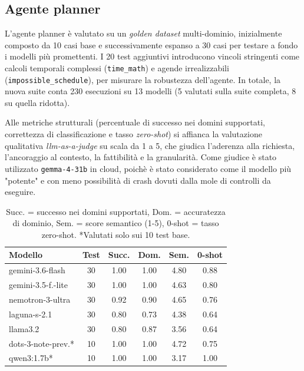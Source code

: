 \documentclass[11pt]{article}
\begin{document}
\subsection{Agente planner}

L'agente planner è valutato su un \textit{golden dataset} multi-dominio, inizialmente composto da 10 casi base e successivamente espanso a 30 casi per testare a fondo i modelli più promettenti. I 20 test aggiuntivi introducono vincoli stringenti come calcoli temporali complessi (\texttt{time\_math}) e agende irrealizzabili (\texttt{impossible\_schedule}), per misurare la robustezza dell'agente. In totale, la nuova suite conta 230 esecuzioni su 13 modelli (5 valutati sulla suite completa, 8 su quella ridotta).

Alle metriche strutturali (percentuale di successo nei domini supportati, correttezza di classificazione e tasso \textit{zero-shot}) si affianca la valutazione qualitativa \textit{llm-as-a-judge} su scala da 1 a 5, che giudica l'aderenza alla richiesta, l'ancoraggio al contesto, la fattibilità e la granularità. Come giudice è stato utilizzato \texttt{gemma-4-31b} in cloud, poichè è stato considerato come il modello più "potente" e con meno possibilità di crash dovuti dalla mole di controlli da eseguire.

\begin{table}[h]
\centering
\small
\setlength{\tabcolsep}{3pt}
\begin{tabular}{lccccc}
\toprule
Modello & Test & Succ. & Dom. & Sem. & 0-shot \\
\midrule
gemini-3.6-flash   & 30 & 1.00 & 1.00 & 4.80 & 0.88 \\
gemini-3.5-f.-lite & 30 & 1.00 & 1.00 & 4.63 & 0.80 \\
nemotron-3-ultra   & 30 & 0.92 & 0.90 & 4.65 & 0.76 \\
laguna-s-2.1       & 30 & 0.80 & 0.73 & 4.38 & 0.64 \\
llama3.2           & 30 & 0.80 & 0.87 & 3.56 & 0.64 \\
\midrule
dots-3-note-prev.* & 10 & 1.00 & 1.00 & 4.72 & 0.75 \\
qwen3:1.7b*        & 10 & 1.00 & 1.00 & 3.17 & 1.00 \\
\bottomrule
\end{tabular}
\caption*{\footnotesize Succ. = successo nei domini supportati, Dom. = accuratezza di dominio, Sem. = score semantico (1-5), 0-shot = tasso zero-shot. *Valutati solo sui 10 test base.}
\end{table}
\end{document}
